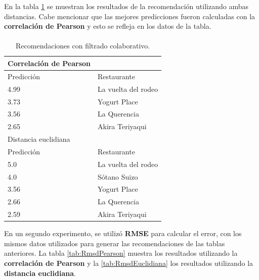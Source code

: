 \documentclass[12pt,letterpaper,oneside] {memoir}
\begin{document}
En la tabla \ref{tab:TableRecom} se muestran los resultados de la recomendación utilizando ambas distancias. Cabe mencionar que las mejores predicciones fueron calculadas con la \textbf{correlación de Pearson} y esto se refleja en los datos de la tabla.
\paragraph*{}
\begin{table}[H]
	\caption{Recomendaciones con filtrado colaborativo.} \begin{center}
\linespread{0.9}\selectfont
\begin{tabular}{>{\footnotesize}p{2.0in}>{\footnotesize}p{2.0in}}
\hline
Correlación de Pearson &  \\
\hline                    
Predicción  & Restaurante    \\
\hline             
4.99  & La vuelta del rodeo  \\
3.73  & Yogurt Place         \\
3.56  & La Querencia         \\
2.65  & Akira Teriyaqui      \\
\hline
Distancia euclidiana       & \\
\hline                    
Predicción  & Restaurante    \\
\hline
5.0   & La vuelta del rodeo  \\
4.0   & Sótano Suizo         \\
3.56  & Yogurt Place         \\
2.66  & La Querencia         \\
2.59  & Akira Teriyaqui      \\
\hline
\end{tabular}
\label{tab:TableRecom}
\end{center}
\end{table}

En un segundo experimento, se utilizó \textbf{RMSE} para calcular el error, con los mismos datos utilizados para generar las recomendaciones de las tablas anteriores. La tabla \ref{tab:RmsdPearson} muestra los resultados utilizando la \textbf{correlación de Pearson} y la \ref{tab:RmsdEuclidiana} los resultados utilizando la \textbf{distancia euclidiana}.
\end{document}

